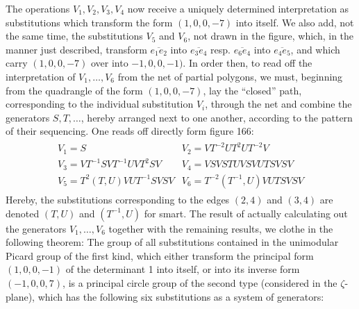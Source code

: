 The operations $V_1, V_2, V_3, V_4$ now receive a uniquely determined interpretation as substitutions which transform the form $(1,0,0,-7)$ into itself. We also add, not the same time, the substitutions $V_5$ and $V_6$, not drawn in the figure, which, in the manner just described, transform $\overline{e_1e_2}$  into $\overline{e_3e_4}$ resp. $\overline{e_6e_4}$ into $\overline{e_4e_5}$, and which carry $(1,0,0,-7)$ over into $-1,0,0,-1)$. In order then, to read off the interpretation of $V_1, \ldots, V_6$ from the net of partial polygons, we must, beginning from the quadrangle of the form $(1,0,0,-7)$, lay the “closed” path, corresponding to the individual substitution $V_i$, through the net and combine the generators $S,T,\ldots$, hereby arranged next to one another, according to the pattern of their sequencing. One reads off directly form figure 166:
\begin{align}
\begin{array}{cc}
V_1=S & V_2=VT^{-2}UT^2UT^{-2}V\\
V_3=VT^{-1}SVT^{-1}UVT^2SV & V_4=VSVSTUVSVUTSVSV\\
V_5=T^2(T,U)VUT^{-1}SVSV & V_6=T^{-2}(T^{-1},U)VUTSVSV
\end{array}
\end{align}
Hereby, the substitutions corresponding to the edges $(2,4)$ and $(3,4)$ are denoted $(T,U)$ and $(T^{-1},U)$ for smart. The result of actually calculating out the generators $V_1,\ldots,V_6$ together with the remaining results, we clothe in the following theorem: The group of all substitutions contained in the unimodular Picard group of the first kind, which either transform the principal form $(1,0,0,-1)$ of the determinant 1 into itself, or into its inverse form $(-1,0,0,7)$, is a principal circle group of the second type (considered in the $\zeta$-plane), which has the following six substitutions as a system of generators:

